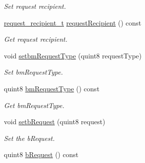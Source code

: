 \begin{DoxyCompactItemize}
\begin{DoxyCompactList}\small\item\em Set request recipient. \end{DoxyCompactList}\item 
\hyperlink{classmdt_frame_usb_control_aaf1f08b1b5e47ab18426800ed0accbde}{request\_\-recipient\_\-t} \hyperlink{classmdt_frame_usb_control_aeb7b5844c0a025ff6692b3724a21a2a4}{requestRecipient} () const 
\begin{DoxyCompactList}\small\item\em Get request recipient. \end{DoxyCompactList}\item 
\hypertarget{classmdt_frame_usb_control_a62121aef1ceb3dd04c78c2fe91b86a4f}{
void \hyperlink{classmdt_frame_usb_control_a62121aef1ceb3dd04c78c2fe91b86a4f}{setbmRequestType} (quint8 requestType)}
\label{classmdt_frame_usb_control_a62121aef1ceb3dd04c78c2fe91b86a4f}

\begin{DoxyCompactList}\small\item\em Set bmRequestType. \end{DoxyCompactList}\item 
\hypertarget{classmdt_frame_usb_control_a760f73ebe2d8cefc1d70c4d22f84fac3}{
quint8 \hyperlink{classmdt_frame_usb_control_a760f73ebe2d8cefc1d70c4d22f84fac3}{bmRequestType} () const }
\label{classmdt_frame_usb_control_a760f73ebe2d8cefc1d70c4d22f84fac3}

\begin{DoxyCompactList}\small\item\em Get bmRequestType. \end{DoxyCompactList}\item 
\hypertarget{classmdt_frame_usb_control_a308340318fd79b4d34d887a026e6e652}{
void \hyperlink{classmdt_frame_usb_control_a308340318fd79b4d34d887a026e6e652}{setbRequest} (quint8 request)}
\label{classmdt_frame_usb_control_a308340318fd79b4d34d887a026e6e652}

\begin{DoxyCompactList}\small\item\em Set the bRequest. \end{DoxyCompactList}\item 
\hypertarget{classmdt_frame_usb_control_ab4c57d23805b5ef21a571d200109b403}{
quint8 \hyperlink{classmdt_frame_usb_control_ab4c57d23805b5ef21a571d200109b403}{bRequest} () const }
\label{classmdt_frame_usb_control_ab4c57d23805b5ef21a571d200109b403}


\end{DoxyCompactItemize}
